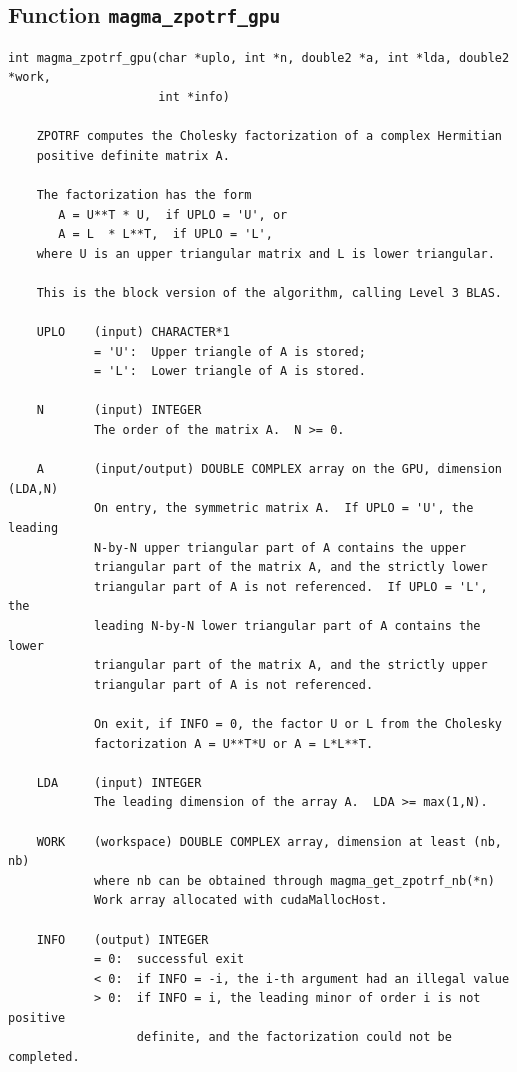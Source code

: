 \documentclass[10pt]{book}
\begin{document}
\subsection{Function {\tt {\bf magma\_zpotrf\_gpu}}}
\begin{verbatim}
int magma_zpotrf_gpu(char *uplo, int *n, double2 *a, int *lda, double2 *work, 
                     int *info)
   
    ZPOTRF computes the Cholesky factorization of a complex Hermitian   
    positive definite matrix A.   

    The factorization has the form   
       A = U**T * U,  if UPLO = 'U', or   
       A = L  * L**T,  if UPLO = 'L',   
    where U is an upper triangular matrix and L is lower triangular.   

    This is the block version of the algorithm, calling Level 3 BLAS.   

    UPLO    (input) CHARACTER*1   
            = 'U':  Upper triangle of A is stored;   
            = 'L':  Lower triangle of A is stored.   

    N       (input) INTEGER   
            The order of the matrix A.  N >= 0.   

    A       (input/output) DOUBLE COMPLEX array on the GPU, dimension (LDA,N)   
            On entry, the symmetric matrix A.  If UPLO = 'U', the leading   
            N-by-N upper triangular part of A contains the upper   
            triangular part of the matrix A, and the strictly lower   
            triangular part of A is not referenced.  If UPLO = 'L', the   
            leading N-by-N lower triangular part of A contains the lower   
            triangular part of the matrix A, and the strictly upper   
            triangular part of A is not referenced.   

            On exit, if INFO = 0, the factor U or L from the Cholesky   
            factorization A = U**T*U or A = L*L**T.   

    LDA     (input) INTEGER   
            The leading dimension of the array A.  LDA >= max(1,N).   

    WORK    (workspace) DOUBLE COMPLEX array, dimension at least (nb, nb)
            where nb can be obtained through magma_get_zpotrf_nb(*n)
            Work array allocated with cudaMallocHost.

    INFO    (output) INTEGER   
            = 0:  successful exit   
            < 0:  if INFO = -i, the i-th argument had an illegal value   
            > 0:  if INFO = i, the leading minor of order i is not positive 
                  definite, and the factorization could not be completed.   
\end{verbatim}
\end{document}
